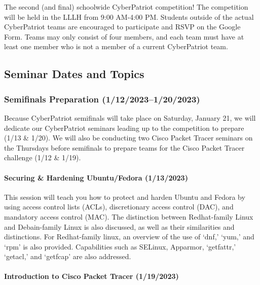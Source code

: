 \documentclass[
  letterpaper,
  DIV=11,
  numbers=noendperiod]{scrartcl}
\let\oldparagraph\paragraph
\renewcommand{\paragraph}[1]{\oldparagraph{#1}\mbox{}}
\begin{document}
The second (and final) schoolwide CyberPatriot competition! The
competition will be held in the LLLH from 9:00 AM-4:00 PM. Students
outside of the actual CyberPatriot teams are encouraged to participate
and RSVP on the Google Form. Teams may only consist of four members, and
each team must have at least one member who is not a member of a current
CyberPatriot team.

\hypertarget{seminar-dates-and-topics-1}{%
\subsection{Seminar Dates and Topics}\label{seminar-dates-and-topics-1}}

\hypertarget{semifinals-preparation-11220231202023}{%
\subsubsection{Semifinals Preparation
(1/12/2023--1/20/2023)}\label{semifinals-preparation-11220231202023}}

Because CyberPatriot semifinals will take place on Saturday, January 21,
we will dedicate our CyberPatriot seminars leading up to the competition
to prepare (1/13 \& 1/20). We will also be conducting two Cisco Packet
Tracer seminars on the Thursdays before semifinals to prepare teams for
the Cisco Packet Tracer challenge (1/12 \& 1/19).

\hypertarget{sec-harden-ubuntu-fedora}{%
\paragraph{Securing \& Hardening Ubuntu/Fedora
(1/13/2023)}\label{sec-harden-ubuntu-fedora}}

This session will teach you how to protect and harden Ubuntu and Fedora
by using access control lists (ACLs), discretionary access control
(DAC), and mandatory access control (MAC). The distinction between
Redhat-family Linux and Debain-family Linux is also discussed, as well
as their similarities and distinctions. For Redhat-family linux, an
overview of the use of `dnf,' `yum,' and `rpm' is also provided.
Capabilities such as SELinux, Apparmor, `getfattr,' `getacl,' and
`getfcap' are also addressed.

\hypertarget{sec-intro-cisco-packet-tracer}{%
\paragraph{Introduction to Cisco Packet Tracer
(1/19/2023)}\label{sec-intro-cisco-packet-tracer}}
\end{document}
